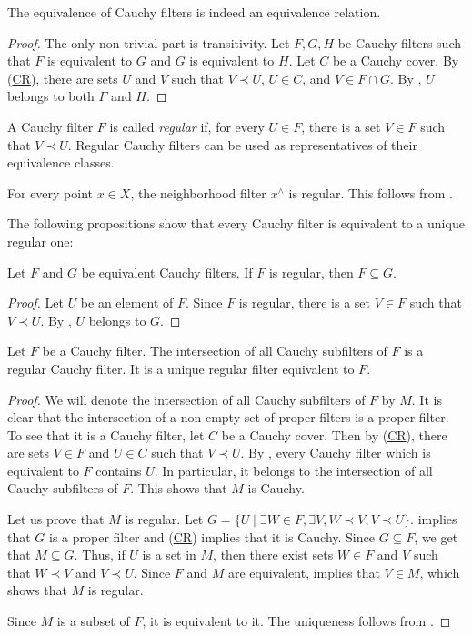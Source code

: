 \documentclass[reqno]{amsart}
\newcommand{\axref}[1]{(\hyperref[ax:#1]{#1})}
\theoremstyle{definition}
\theoremstyle{remark}
\numberwithin{figure}{section}
\newcommand{\rb}{\prec}
\begin{document}
\begin{prop}
The equivalence of Cauchy filters is indeed an equivalence relation.
\end{prop}
\begin{proof}
The only non-trivial part is transitivity.
Let $F,G,H$ be Cauchy filters such that $F$ is equivalent to $G$ and $G$ is equivalent to $H$.
Let $C$ be a Cauchy cover.
By \axref{CR}, there are sets $U$ and $V$ such that $V \rb U$, $U \in C$, and $V \in F \cap G$.
By , $U$ belongs to both $F$ and $H$.
\end{proof}

A Cauchy filter $F$ is called \emph{regular} if, for every $U \in F$, there is a set $V \in F$ such that $V \rb U$.
Regular Cauchy filters can be used as representatives of their equivalence classes.

\begin{example}
For every point $x \in X$, the neighborhood filter $x^\wedge$ is regular.
This follows from .
\end{example}

The following propositions show that every Cauchy filter is equivalent to a unique regular one:

\begin{prop}
Let $F$ and $G$ be equivalent Cauchy filters.
If $F$ is regular, then $F \subseteq G$.
\end{prop}
\begin{proof}
Let $U$ be an element of $F$.
Since $F$ is regular, there is a set $V \in F$ such that $V \rb U$.
By , $U$ belongs to $G$.
\end{proof}

\begin{prop}
Let $F$ be a Cauchy filter.
The intersection of all Cauchy subfilters of $F$ is a regular Cauchy filter.
It is a unique regular filter equivalent to $F$.
\end{prop}
\begin{proof}
We will denote the intersection of all Cauchy subfilters of $F$ by $M$.
It is clear that the intersection of a non-empty set of proper filters is a proper filter.
To see that it is a Cauchy filter, let $C$ be a Cauchy cover.
Then by \axref{CR}, there are sets $V \in F$ and $U \in C$ such that $V \rb U$.
By , every Cauchy filter which is equivalent to $F$ contains $U$.
In particular, it belongs to the intersection of all Cauchy subfilters of $F$.
This shows that $M$ is Cauchy.

Let us prove that $M$ is regular.
Let $G = \{ U \mid \exists W \in F, \exists V, W \rb V, V \rb U \}$.
 implies that $G$ is a proper filter and \axref{CR} implies that it is Cauchy.
Since $G \subseteq F$, we get that $M \subseteq G$.
Thus, if $U$ is a set in $M$, then there exist sets $W \in F$ and $V$ such that $W \rb V$ and $V \rb U$.
Since $F$ and $M$ are equivalent,  implies that $V \in M$, which shows that $M$ is regular.

Since $M$ is a subset of $F$, it is equivalent to it.
The uniqueness follows from .
\end{proof}
\end{document}
